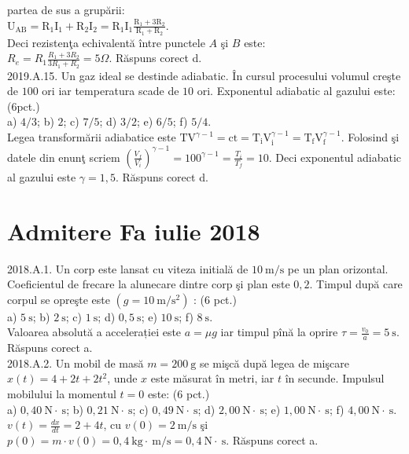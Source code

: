 partea de sus a grupării:\\ $\mathrm{U}_{\mathrm{AB}}=\mathrm{R}_{1} \mathrm{I}_{1}+\mathrm{R}_{2} \mathrm{I}_{2}=\mathrm{R}_{1} \mathrm{I}_{1} \frac{\mathrm{R}_{1}+3 \mathrm{R}_{2}}{\mathrm{R}_{1}+\mathrm{R}_{2}}$.\\ Deci rezistenţa echivalentă între punctele $A$ şi $B$ este:\\ $R_{e}=R_{1} \frac{R_{1}+3 R_{2}}{3 R_{1}+R_{2}}=5 \Omega$. Răspuns corect d.\\

2019.A.15. Un gaz ideal se destinde adiabatic. În cursul procesului volumul creşte de $100$ ori iar temperatura scade de $10$ ori. Exponentul adiabatic al gazului este: (6pct.)\\ a) $4 / 3$; b) $2$; c) $7 / 5$; d) $3 / 2$; e) $6 / 5$; f) $5 / 4$.\\ Legea transformării adiabatice este $\mathrm{TV}^{\gamma-1}=\mathrm{ct}=\mathrm{T}_{\mathrm{i}} \mathrm{V}_{\mathrm{i}}^{\gamma-1}=\mathrm{T}_{\mathrm{f}} \mathrm{V}_{\mathrm{f}}^{\gamma-1}$. Folosind şi datele din enunţ scriem $\left(\frac{V_{f}}{V_{i}}\right)^{\gamma-1}=100^{\gamma-1}=\frac{T_{i}}{T_{f}}=10$. Deci exponentul adiabatic al gazului este $\gamma=1,5$. Răspuns corect d.\\

\section{Admitere Fa iulie 2018}

2018.A.1. Un corp este lansat cu viteza initială de $10 \mathrm{~m} / \mathrm{s}$ pe un plan orizontal. Coeficientul de frecare la alunecare dintre corp şi plan este $0,2$. Timpul după care corpul se opreşte este $\left(g=10 \mathrm{~m} / \mathrm{s}^{2}\right)$ : (6 pct.)\\ a) $5 \mathrm{~s}$; b) $2 \mathrm{~s}$; c) $1 \mathrm{~s}$; d) $0,5 \mathrm{~s}$; e) $10 \mathrm{~s}$; f) $8 \mathrm{~s}$.\\ Valoarea absolută a accelerației este $a=\mu g$ iar timpul pînă la oprire $\tau=\frac{v_{0}}{a}=5 \mathrm{~s}$. Răspuns corect a.\\

2018.A.2. Un mobil de masă $m=200 \mathrm{~g}$ se mişcă după legea de mişcare $x(t)=4+2 t+2 t^{2}$, unde $x$ este măsurat în metri, iar $t$ în secunde. Impulsul mobilului la momentul $t=0$ este: (6 pct.)\\ a) $0,40 \mathrm{~N} \cdot \mathrm{~s}$; b) $0,21 \mathrm{~N} \cdot \mathrm{~s}$; c) $0,49 \mathrm{~N} \cdot \mathrm{~s}$; d) $2,00 \mathrm{~N} \cdot \mathrm{~s}$; e) $1,00 \mathrm{~N} \cdot \mathrm{~s}$; f) $4,00 \mathrm{~N} \cdot \mathrm{~s}$.\\ $v(t)=\frac{d x}{d t}=2+4 t$, cu $v(0)=2 \mathrm{~m} / \mathrm{s}$ şi $p(0)=m \cdot v(0)=0,4 \mathrm{~kg} \cdot \mathrm{~m} / \mathrm{s}=0,4 \mathrm{~N} \cdot \mathrm{~s}$. Răspuns corect a.\\

